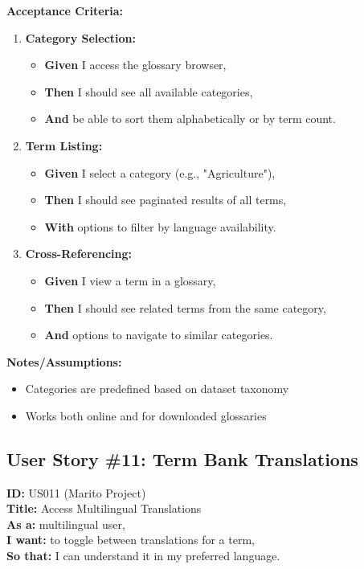 \documentclass[12pt]{article}
\begin{document}
\vspace{1em}
\textbf{Acceptance Criteria:}
\begin{enumerate}
    \item \textbf{Category Selection:}
    \begin{itemize}
        \item \textbf{Given} I access the glossary browser,
        \item \textbf{Then} I should see all available categories,
        \item \textbf{And} be able to sort them alphabetically or by term count.
    \end{itemize}

    \item \textbf{Term Listing:}
    \begin{itemize}
        \item \textbf{Given} I select a category (e.g., "Agriculture"),
        \item \textbf{Then} I should see paginated results of all terms,
        \item \textbf{With} options to filter by language availability.
    \end{itemize}

    \item \textbf{Cross-Referencing:}
    \begin{itemize}
        \item \textbf{Given} I view a term in a glossary,
        \item \textbf{Then} I should see related terms from the same category,
        \item \textbf{And} options to navigate to similar categories.
    \end{itemize}
\end{enumerate}

\vspace{1em}
\textbf{Notes/Assumptions:}
\begin{itemize}
    \item Categories are predefined based on dataset taxonomy
    \item Works both online and for downloaded glossaries
\end{itemize}

\subsection{User Story \#11: Term Bank Translations}
\textbf{ID:} US011 (Marito Project) \\
\textbf{Title:} Access Multilingual Translations \\
\textbf{As a:} multilingual user, \\
\textbf{I want:} to toggle between translations for a term, \\
\textbf{So that:} I can understand it in my preferred language.
\end{document}
